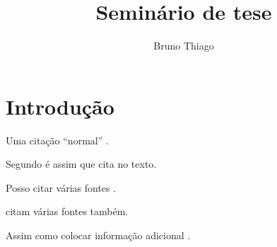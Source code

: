 \documentclass{article}
\author{Bruno Thiago}
\title{Seminário de tese}
\begin{document}
\maketitle

\begin{abstract}
	\lipsum[1]
\end{abstract}

\section{Introdução}
Uma citação ``normal'' \cite{silvaBIM4DNo2019}.

Segundo \textcite{dynamoDynamoBIM} é assim que cita no texto.

Posso citar várias fontes \cites{nrelEnergyPlus2024,ronzaniEstudoITAPara2020}.

\textcites{wenProgressTrendBIM2021,autodeskNavisworks3DModel2024} citam várias fontes também.

Assim como colocar informação adicional \cite[pre][post]{pauwelsIFCtoRDF2024}.

\printbibliography
\end{document}

